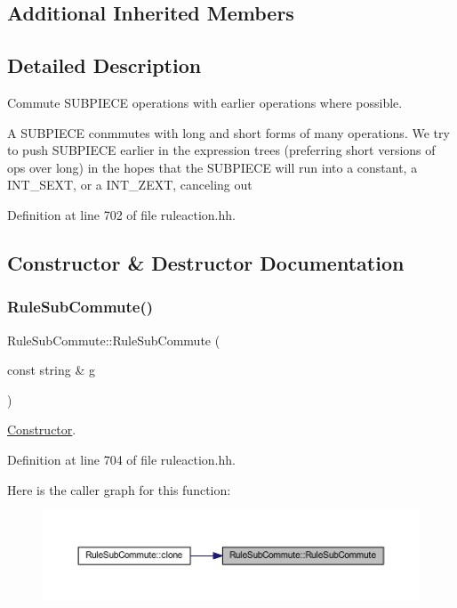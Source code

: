 \subsection*{Additional Inherited Members}


\subsection{Detailed Description}
Commute S\+U\+B\+P\+I\+E\+CE operations with earlier operations where possible. 

A S\+U\+B\+P\+I\+E\+CE conmmutes with long and short forms of many operations. We try to push S\+U\+B\+P\+I\+E\+CE earlier in the expression trees (preferring short versions of ops over long) in the hopes that the S\+U\+B\+P\+I\+E\+CE will run into a constant, a I\+N\+T\+\_\+\+S\+E\+XT, or a I\+N\+T\+\_\+\+Z\+E\+XT, canceling out 

Definition at line 702 of file ruleaction.\+hh.



\subsection{Constructor \& Destructor Documentation}
\mbox{\label{class_rule_sub_commute_a228696365bae90785d4c2bb901cf5611}} 
\subsubsection{\texorpdfstring{RuleSubCommute()}{RuleSubCommute()}}
{\footnotesize\ttfamily Rule\+Sub\+Commute\+::\+Rule\+Sub\+Commute (\begin{DoxyParamCaption}\item[{const string \&}]{g }\end{DoxyParamCaption})\hspace{0.3cm}{\ttfamily [inline]}}



\mbox{\hyperlink{class_constructor}{Constructor}}. 



Definition at line 704 of file ruleaction.\+hh.

Here is the caller graph for this function\+:
\nopagebreak
\begin{figure}[H]
\begin{center}
\leavevmode
\includegraphics[width=350pt]{class_rule_sub_commute_a228696365bae90785d4c2bb901cf5611_icgraph}
\end{center}
\end{figure}


